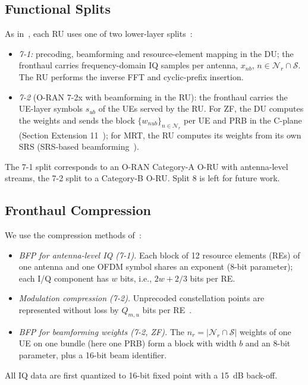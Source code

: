 \documentclass[10pt, final, journal, letterpaper, twocolumn]{IEEEtran}
\begin{document}
\subsection{Functional Splits}
\label{subsec:splits}

As in~\cite{girycki2024eucnc}, each RU uses one of two lower-layer splits~\cite{tr38801,tr38816,oran_cus_v22}:
\begin{itemize}
  \item \emph{7-1:} precoding, beamforming and resource-element mapping in the DU; the fronthaul carries frequency-domain IQ samples per antenna, $x_{nb}$, $n\in\mathcal{N}_r\cap\mathcal{S}$. The RU performs the inverse FFT and cyclic-prefix insertion.
  \item \emph{7-2} (O-RAN 7-2x with beamforming in the RU): the fronthaul carries the UE-layer symbols $s_{ub}$ of the UEs served by the RU. For ZF, the DU computes the weights and sends the block $\{w_{nub}\}_{n\in\mathcal{N}_r}$ per UE and PRB in the C-plane (Section Extension 11~\cite{oran_cus_v22}); for MRT, the RU computes its weights from its own SRS (SRS-based beamforming~\cite{oran_cus_v22}).
\end{itemize}
The 7-1 split corresponds to an O-RAN Category-A O-RU with antenna-level streams, the 7-2 split to a Category-B O-RU. Split 8 is left for future work.

\subsection{Fronthaul Compression}
\label{subsec:compression}

We use the compression methods of~\cite[Annex~A]{oran_cus_v22}:
\begin{itemize}
  \item \emph{BFP for antenna-level IQ (7-1).} Each block of 12 resource elements (REs) of one antenna and one OFDM symbol shares an exponent (8-bit parameter); each I/Q component has $w$ bits, i.e., $2w+2/3$ bits per RE.
  \item \emph{Modulation compression (7-2).} Unprecoded constellation points are represented without loss by $Q_{m,u}$ bits per RE~\cite{lagen2021modcomp}.
  \item \emph{BFP for beamforming weights (7-2, ZF).} The $n_r = |\mathcal{N}_r\cap\mathcal{S}|$ weights of one UE on one bundle (here one PRB) form a block with width $b$ and an 8-bit parameter, plus a 16-bit beam identifier.
\end{itemize}
All IQ data are first quantized to 16-bit fixed point with a 15~dB back-off.
\end{document}
